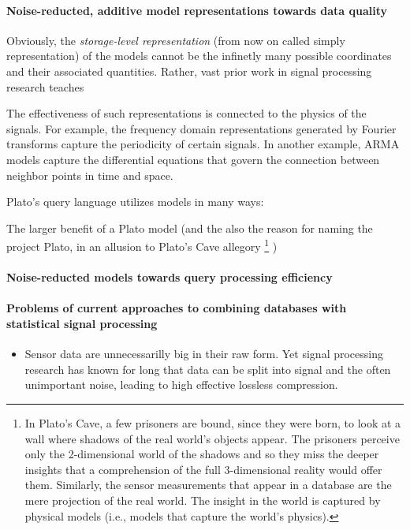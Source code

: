 \paragraph{Noise-reducted, additive model representations towards data quality}
Obviously, the {\em storage-level representation} (from now on called simply representation) of the models cannot be the infinetly many possible coordinates and their associated quantities. Rather, vast prior work in signal processing research teaches 

The effectiveness of such representations is connected to the physics of the signals. For example, the frequency domain representations generated by Fourier transforms capture the periodicity of certain signals. In another example, ARMA models capture the differential equations that govern the connection between neighbor points in time and space.

Plato's query language utilizes models in many ways: 


The larger benefit of a Plato model (and the also the reason for naming the project Plato, in an allusion to Plato's Cave allegory%
\footnote{In Plato's Cave, a few prisoners are bound, since they were born, to look at a wall where shadows of the real world's objects appear. The prisoners perceive only the 2-dimensional world of the shadows and so they miss the deeper insights that a comprehension of the full 3-dimensional reality would offer them. Similarly, the sensor measurements that appear in a database are the mere projection of the real world. The insight in the world is captured by physical models (i.e., models that capture the world's physics). 
}
)

\paragraph{Noise-reducted models towards query processing efficiency}





\paragraph{Problems of current approaches to combining databases with statistical signal processing}
\begin{itemize}
%
\item Sensor data are unnecessarilly big in their raw form. Yet signal processing research has known for long that data can be split into signal and the often unimportant noise, leading to high effective lossless compression. 
%
\end{itemize}

